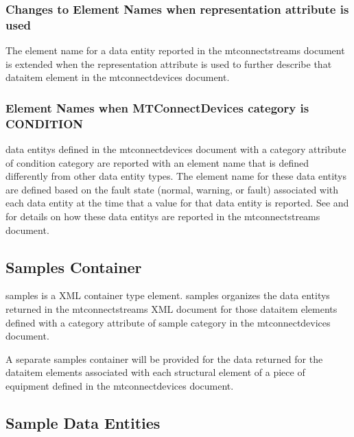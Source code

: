 \subsubsection{Changes to Element Names when representation attribute is used}

The \gls{element name} for a \gls{data entity} reported in the \gls{mtconnectstreams} document is extended when the \gls{representation} attribute is used to further describe that \gls{dataitem} element in the \gls{mtconnectdevices} document.



\subsubsection{Element Names when MTConnectDevices category is CONDITION}

\glspl{data entity} defined in the \gls{mtconnectdevices} document with a \gls{category} attribute of \gls{condition category} are reported with an \gls{element name} that is defined differently from other \gls{data entity} \glspl{type}.  The \gls{element name} for these \glspl{data entity} are defined based on the \gls{fault state} (\gls{normal}, \gls{warning}, or \gls{fault}) associated with each \gls{data entity} at the time that a value for that \gls{data entity} is reported.  See  and  for details on how these \glspl{data entity} are reported in the \gls{mtconnectstreams} document.

\subsection{Samples Container}

\gls{samples} is a XML container type element.   \gls{samples} organizes the \glspl{data entity} returned in the \gls{mtconnectstreams} XML document for those \gls{dataitem} elements defined with a \gls{category} attribute of \gls{sample category} in the \gls{mtconnectdevices} document.

A separate \gls{samples} container will be provided for the data returned for the \gls{dataitem} elements associated with each \gls{structural element} of a piece of equipment defined in the \gls{mtconnectdevices} document.



\subsection{Sample Data Entities}

